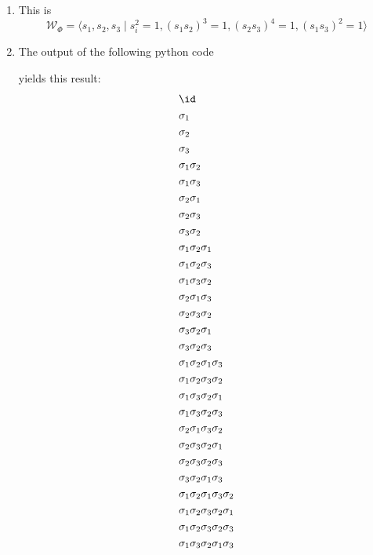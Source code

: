 \documentclass[11pt, headheight=30pt]{scrartcl}
\begin{document}
\begin{enumerate}[(1)]
    \item This is
    \[
        \mathcal{W}_\Phi = \langle s_1, s_2, s_3 \mid s_i^2 = 1, (s_1s_2)^3 = 1, (s_2s_3)^4 = 1, (s_1s_3)^2 = 1 \rangle
    \]
    \item The output of the following python code
    
    yields this result:
    \begin{align*}
        &\id\\
        &\sigma_1\\
        &\sigma_2\\
        &\sigma_3\\
        &\sigma_1 \sigma_2\\
        &\sigma_1 \sigma_3\\
        &\sigma_2 \sigma_1\\
        &\sigma_2 \sigma_3\\
        &\sigma_3 \sigma_2\\
        &\sigma_1 \sigma_2 \sigma_1\\
        &\sigma_1 \sigma_2 \sigma_3\\
        &\sigma_1 \sigma_3 \sigma_2\\
        &\sigma_2 \sigma_1 \sigma_3\\
        &\sigma_2 \sigma_3 \sigma_2\\
        &\sigma_3 \sigma_2 \sigma_1\\
        &\sigma_3 \sigma_2 \sigma_3\\
        &\sigma_1 \sigma_2 \sigma_1 \sigma_3\\
        &\sigma_1 \sigma_2 \sigma_3 \sigma_2\\
        &\sigma_1 \sigma_3 \sigma_2 \sigma_1\\
        &\sigma_1 \sigma_3 \sigma_2 \sigma_3\\
        &\sigma_2 \sigma_1 \sigma_3 \sigma_2\\
        &\sigma_2 \sigma_3 \sigma_2 \sigma_1\\
        &\sigma_2 \sigma_3 \sigma_2 \sigma_3\\
        &\sigma_3 \sigma_2 \sigma_1 \sigma_3\\
        &\sigma_1 \sigma_2 \sigma_1 \sigma_3 \sigma_2\\
        &\sigma_1 \sigma_2 \sigma_3 \sigma_2 \sigma_1\\
        &\sigma_1 \sigma_2 \sigma_3 \sigma_2 \sigma_3\\
        &\sigma_1 \sigma_3 \sigma_2 \sigma_1 \sigma_3\\

\end{align*}
\end{enumerate}
\end{document}
